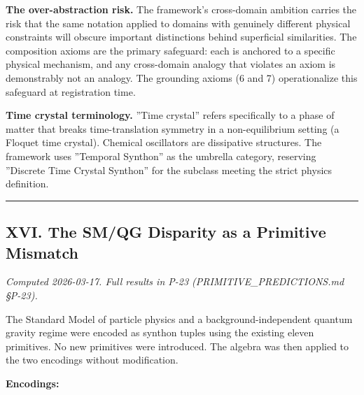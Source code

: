 \documentclass[12pt,a4paper]{article}
\begin{document}
\textbf{The over-abstraction risk.} The framework's cross-domain ambition carries the risk that the same notation applied to domains with genuinely different physical constraints will obscure important distinctions behind superficial similarities. The composition axioms are the primary safeguard: each is anchored to a specific physical mechanism, and any cross-domain analogy that violates an axiom is demonstrably not an analogy. The grounding axioms (6 and 7) operationalize this safeguard at registration time.

\textbf{Time crystal terminology.} ''Time crystal'' refers specifically to a phase of matter that breaks time-translation symmetry in a non-equilibrium setting (a Floquet time crystal). Chemical oscillators are dissipative structures. The framework uses ''Temporal Synthon'' as the umbrella category, reserving ''Discrete Time Crystal Synthon'' for the subclass meeting the strict physics definition.

\begin{center}
\rule{0.5\textwidth}{0.4pt}
\end{center}

\subsection{XVI. The SM/QG Disparity as a Primitive Mismatch}

\emph{Computed 2026-03-17. Full results in P-23 (PRIMITIVE\_PREDICTIONS.md §P-23).}

The Standard Model of particle physics and a background-independent quantum gravity regime were encoded as synthon tuples using the existing eleven primitives. No new primitives were introduced. The algebra was then applied to the two encodings without modification.

\textbf{Encodings:}
\end{document}
